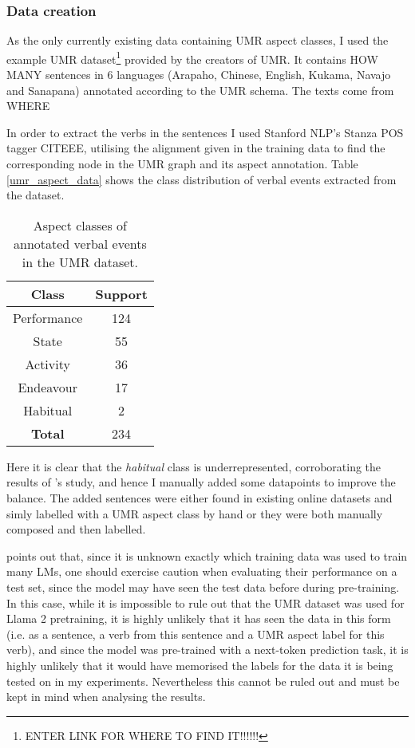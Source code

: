 \subsubsection*{Data creation}
As the only currently existing data containing UMR aspect classes, I used the example UMR dataset\footnote{ENTER LINK FOR WHERE TO FIND IT!!!!!!} provided by the creators of UMR. It contains HOW MANY sentences in 6 languages (Arapaho, Chinese, English, Kukama, Navajo and Sanapana) annotated according to the UMR schema. The texts come from WHERE 

In order to extract the verbs in the sentences I used Stanford NLP's Stanza POS tagger CITEEE, utilising the alignment given in the training data to find the corresponding node in the UMR graph and its aspect annotation. Table \ref*{umr_aspect_data} shows the class distribution of verbal events extracted from the dataset.
\begin{table}
    \centering
    \begin{tabular}{|c|c|}
        Class & Support \\ \hline
        Performance & 124 \\
        State & 55 \\
        Activity & 36 \\
        Endeavour & 17 \\
        Habitual & 2 \\ \hline
        \textbf{Total} & 234
    \end{tabular}
    \caption{Aspect classes of annotated verbal events in the UMR dataset.}
\end{table}
\label{umr_aspect_data}

Here it is clear that the \emph{habitual} class is underrepresented, corroborating the results of \citet{Dahl1985TenseAA}'s study, and hence I manually added some datapoints to improve the balance. The added sentences were either found in existing online datasets and simly labelled with a UMR aspect class by hand or they were both manually composed and then labelled.

\citet{törnberg2024best} points out that, since it is unknown exactly which training data was used to train many LMs, one should exercise caution when evaluating their performance on a test set, since the model may have seen the test data before during pre-training. In this case, while it is impossible to rule out that the UMR dataset was used for Llama 2 pretraining, it is highly unlikely that it has seen the data in this form (i.e. as a sentence, a verb from this sentence and a UMR aspect label for this verb), and since the model was pre-trained with a next-token prediction task, it is highly unlikely that it would have memorised the labels for the data it is being tested on in my experiments. Nevertheless this cannot be ruled out and must be kept in mind when analysing the results.


